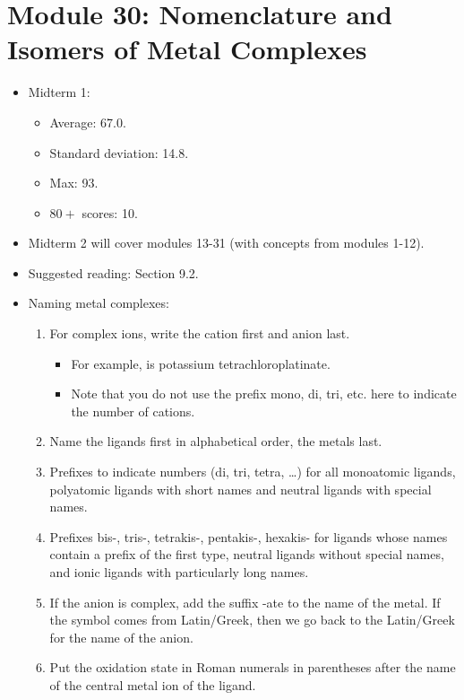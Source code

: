 \documentclass[../notes.tex]{subfiles}
\begin{document}
\section{Module 30: Nomenclature and Isomers of Metal Complexes}
\begin{itemize}
    \item {}Midterm 1:
    \begin{itemize}
        \item Average: 67.0.
        \item Standard deviation: 14.8.
        \item Max: 93.
        \item $80+$ scores: 10.
    \end{itemize}
    \item Midterm 2 will cover modules 13-31 (with concepts from modules 1-12).
    \item Suggested reading: \textcite{bib:MiesslerFischerTarr} Section 9.2.
    \item Naming metal complexes:
    \begin{enumerate}
        \item For complex ions, write the cation first and anion last.
        \begin{itemize}
            \item For example,  is potassium tetrachloroplatinate.
            \item Note that you do not use the prefix mono, di, tri, etc. here to indicate the number of cations.
        \end{itemize}
        \item Name the ligands first in alphabetical order, the metals last.
        \item Prefixes to indicate numbers (di, tri, tetra, \dots) for all monoatomic ligands, polyatomic ligands with short names and neutral ligands with special names.
        \item Prefixes bis-, tris-, tetrakis-, pentakis-, hexakis- for ligands whose names contain a prefix of the first type, neutral ligands without special names, and ionic ligands with particularly long names.
        \item If the anion is complex, add the suffix -ate to the name of the metal. If the symbol comes from Latin/Greek, then we go back to the Latin/Greek for the name of the anion.
        \item Put the oxidation state in Roman numerals in parentheses after the name of the central metal ion of the ligand.

\end{enumerate}
\end{itemize}
\end{document}
